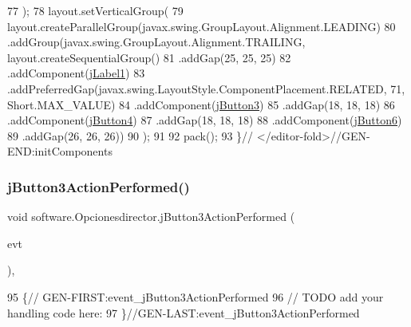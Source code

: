 \begin{DoxyCode}
77         );
78         layout.setVerticalGroup(
79             layout.createParallelGroup(javax.swing.GroupLayout.Alignment.LEADING)
80             .addGroup(javax.swing.GroupLayout.Alignment.TRAILING, layout.createSequentialGroup()
81                 .addGap(25, 25, 25)
82                 .addComponent(\mbox{\hyperlink{classsoftware_1_1_opcionesdirector_aa19e2adc2e7b50296972e1d6fd9d0b65}{jLabel1}})
83                 .addPreferredGap(javax.swing.LayoutStyle.ComponentPlacement.RELATED, 71, Short.MAX\_VALUE)
84                 .addComponent(\mbox{\hyperlink{classsoftware_1_1_opcionesdirector_a6bf8e6340c64a01cd895c1194d0e2fca}{jButton3}})
85                 .addGap(18, 18, 18)
86                 .addComponent(\mbox{\hyperlink{classsoftware_1_1_opcionesdirector_a2e31e9baad7d82ddcdf5f15d48c07483}{jButton4}})
87                 .addGap(18, 18, 18)
88                 .addComponent(\mbox{\hyperlink{classsoftware_1_1_opcionesdirector_ab4528484730d083362682ff5055fb012}{jButton6}})
89                 .addGap(26, 26, 26))
90         );
91 
92         pack();
93     \}\textcolor{comment}{// </editor-fold>//GEN-END:initComponents}
\end{DoxyCode}
\mbox{\label{classsoftware_1_1_opcionesdirector_a32bd43410331428c339f5c613239cf58}} 
\subsubsection{\texorpdfstring{j\+Button3\+Action\+Performed()}{jButton3ActionPerformed()}}
{\footnotesize\ttfamily void software.\+Opcionesdirector.\+j\+Button3\+Action\+Performed (\begin{DoxyParamCaption}\item[{java.\+awt.\+event.\+Action\+Event}]{evt }\end{DoxyParamCaption})\hspace{0.3cm}{\ttfamily [inline]}, {\ttfamily [private]}}


\begin{DoxyCode}
95                                                                          \{\textcolor{comment}{//
      GEN-FIRST:event\_jButton3ActionPerformed}
96         \textcolor{comment}{// TODO add your handling code here:}
97     \}\textcolor{comment}{//GEN-LAST:event\_jButton3ActionPerformed}
\end{DoxyCode}
\mbox{\label{classsoftware_1_1_opcionesdirector_ac54a366add94d48d2b25ed78bfd9dcc4}} 
